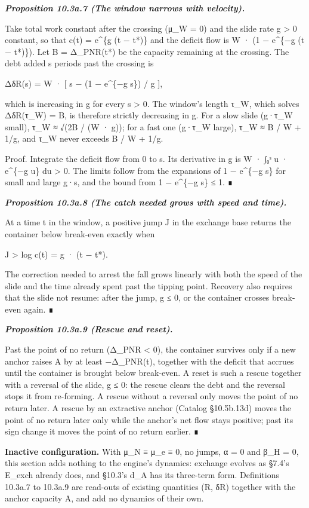 \documentclass[
]{article}
\begin{document}
\emph{\textbf{Proposition 10.3a.7 (The window narrows with velocity).}}

Take total work constant after the crossing (μ\_W = 0) and the slide
rate g \textgreater{} 0 constant, so that c(t) = e\^{}\{g (t − t*)\} and
the deficit flow is W · (1 − e\^{}\{−g (t − t*)\}). Let B = Δ\_PNR(t*)
be the capacity remaining at the crossing. The debt added s periods past
the crossing is

ΔδR(s) = W · {[} s − (1 − e\^{}\{−g s\}) / g {]},

which is increasing in g for every s \textgreater{} 0. The window's
length τ\_W, which solves ΔδR(τ\_W) = B, is therefore strictly
decreasing in g. For a slow slide (g·τ\_W small), τ\_W ≈ √(2B / (W ·
g)); for a fast one (g·τ\_W large), τ\_W ≈ B / W + 1/g, and τ\_W never
exceeds B / W + 1/g.

Proof. Integrate the deficit flow from 0 to s. Its derivative in g is W
· ∫₀ˢ u · e\^{}\{−g u\} du \textgreater{} 0. The limits follow from the
expansions of 1 − e\^{}\{−g s\} for small and large g·s, and the bound
from 1 − e\^{}\{−g s\} ≤ 1. ∎

\emph{\textbf{Proposition 10.3a.8 (The catch needed grows with speed and
time).}}

At a time t in the window, a positive jump J in the exchange base
returns the container below break-even exactly when

J \textgreater{} log c(t) = g · (t − t*).

The correction needed to arrest the fall grows linearly with both the
speed of the slide and the time already spent past the tipping point.
Recovery also requires that the slide not resume: after the jump, g ≤ 0,
or the container crosses break-even again. ∎

\emph{\textbf{Proposition 10.3a.9 (Rescue and reset).}}

Past the point of no return (Δ\_PNR \textless{} 0), the container
survives only if a new anchor raises A by at least −Δ\_PNR(t), together
with the deficit that accrues until the container is brought below
break-even. A reset is such a rescue together with a reversal of the
slide, g ≤ 0: the rescue clears the debt and the reversal stops it from
re-forming. A rescue without a reversal only moves the point of no
return later. A rescue by an extractive anchor (Catalog §10.5b.13d)
moves the point of no return later only while the anchor's net flow
stays positive; past its sign change it moves the point of no return
earlier. ∎

\textbf{Inactive configuration.} With μ\_N ≡ μ\_e ≡ 0, no jumps, α = 0
and β\_H = 0, this section adds nothing to the engine's dynamics:
exchange evolves as §7.4's E\_exch already does, and §10.3's d\_A has
its three-term form. Definitions 10.3a.7 to 10.3a.9 are read-outs of
existing quantities (R, δR) together with the anchor capacity A, and add
no dynamics of their own.
\end{document}
